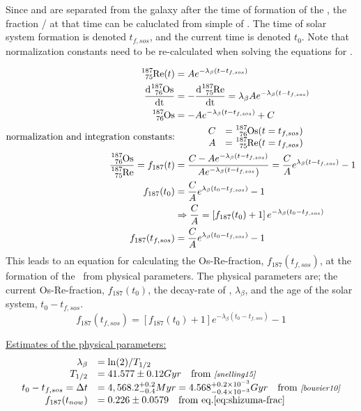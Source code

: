 Since  and  are separated from the galaxy after the time of formation of the \sos,
the fraction / at that time can be caluclated from simple \betadecay of .
The time of solar system formation is denoted $t_{f,sos}$, and the current time is denoted $t_0$.
Note that normalization constants need to be re-calculated when solving the equations for \betadecay.

\begin{align*}
  \re{187}(t) &= A e^{-\lambda_\beta (t-t_{f,sos})} \\
  \d{\os{187}} &= -\d{\re{187}} = \lambda_\beta A e^{-\lambda_\beta (t-t_{f,sos})} \\
  \os{187} &= - A e^{-\lambda_\beta (t-t_{f,sos})} + C \\
  \textrm{normalization and integration constants:} &
  \hspace{3em}
  \begin{array}{rl}
    C &= \os{187}(t=t_{f,sos}) \\
    A &= \re{187}(t=t_{f,sos})
  \end{array} \\
  \fraction = f_{187}(t) &= \frac{C - Ae^{-\lambda_\beta (t-t_{f,sos})}}{Ae^{-\lambda_\beta (t-t_{f,sos}})}
  = \frac{C}{A}e^{\lambda_\beta (t-t_{f,sos})} - 1 \\
  f_{187}(t_0) &= \frac{C}{A}e^{\lambda_\beta (t_0-t_{f,sos})} - 1 \\
  & \Rightarrow \frac{C}{A} = \left[ f_{187}(t_0) + 1\right]e^{-\lambda_\beta (t_0-t_{f,sos})} \\
  f_{187}(t_{f,sos}) &= \frac{C}{A}e^{\lambda_\beta (t_0-t_{f,sos})} - 1
\end{align*}
This leads to an equation for calculating the Os-Re-fraction, $f_{187}(t_{f,sos})$, at the formation of the \sos\ from physical parameters.
The physical parameters are; the current Os-Re-fraction, $f_{187}(t_{0})$, the decay-rate of , $\lambda_\beta$, and the age of the solar system, $t_0-t_{f,sos}$.
\begin{equation}
  \label{eq:frac-fsos}
  f_{187}(t_{f,sos}) = \left[ f_{187}(t_0) + 1\right]e^{-\lambda_\beta (t_0-t_{f,sos})} - 1
\end{equation}

\underline{Estimates of the physical parameters:}
\begin{equation}
  \label{eq:parameter-sources}
  \begin{array}{rl}
  \lambda_\beta &= \ln(2)/T_{1/2} \\
  T_{1/2} &= 41.577 \pm 0.12 Gyr \quad \textrm{from \mycite{snelling15}} \\
  t_0 - t_{f,sos} = \Delta t &= 4,568.2^{+0.2}_{-0.4} Myr
  = 4.568^{+0.2\times 10^{-3}}_{-0.4\times 10^{-3}} Gyr \quad \textrm{from \mycite{bouvier10}} \\
  \fracnow &= 0.226 \pm 0.0579 \quad \textrm{from eq.\ref{eq:shizuma-frac}}
  \end{array}
\end{equation}

